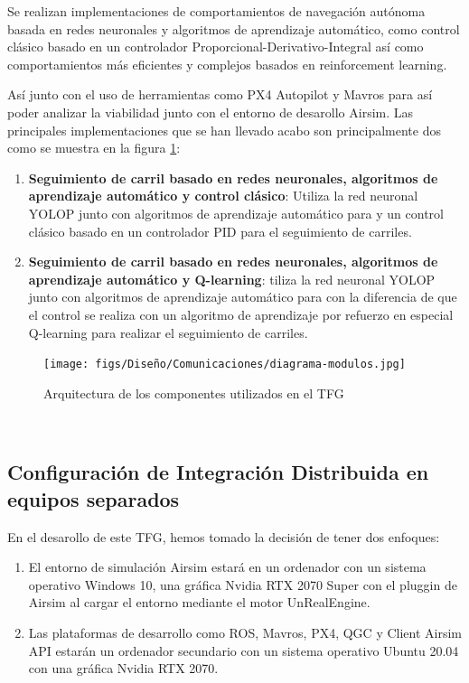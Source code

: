 Se realizan implementaciones de comportamientos de navegación autónoma basada en redes neuronales y algoritmos de aprendizaje automático, como control clásico basado en 
un controlador Proporcional-Derivativo-Integral así como comportamientos más eficientes y complejos basados en reinforcement learning.

Así junto con el uso de herramientas como PX4 Autopilot y Mavros para así poder analizar la viabilidad junto con el entorno de desarollo Airsim. Las principales implementaciones que se han 
llevado acabo son principalmente dos como se muestra en la figura \ref{fig:infraestructura}:

\begin{enumerate}
  \item \textbf{Seguimiento de carril basado en redes neuronales, algoritmos de aprendizaje automático y control clásico}: Utiliza la red neuronal YOLOP junto con algoritmos de aprendizaje automático para 
   y un control clásico basado en un controlador PID para el seguimiento de carriles.
  \item \textbf{Seguimiento de carril basado en redes neuronales, algoritmos de aprendizaje automático y Q-learning}: tiliza la red neuronal YOLOP junto con algoritmos de aprendizaje automático para 
  con la diferencia de que el control se realiza con un algoritmo de aprendizaje por refuerzo en especial Q-learning para realizar el seguimiento de carriles.
\end{enumerate}

\begin{figure} [H]
    \begin{center}
      \texttt{[image: figs/Diseño/Comunicaciones/diagrama-modulos.jpg]}
    \end{center}
    \caption{Arquitectura de los componentes utilizados en el TFG}
    \label{fig:infraestructura}
  \end{figure}\

\subsection{Configuración de Integración Distribuida en equipos separados}
En el desarollo de este TFG, hemos tomado la decisión de tener dos enfoques:

\begin{enumerate}
  \item El entorno de simulación Airsim estará en un ordenador con un sistema operativo Windows 10, una gráfica Nvidia RTX 2070 Super con el pluggin de 
  Airsim al cargar el entorno mediante el motor UnRealEngine.
  \item Las plataformas de desarrollo como ROS, Mavros, PX4, QGC y Client Airsim API estarán un  ordenador secundario con un sistema operativo Ubuntu 20.04 con una gráfica Nvidia RTX
  2070.
\end{enumerate}

